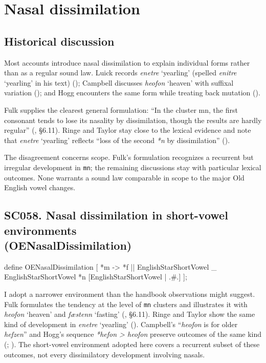 \documentclass[
  british,
  a4paper,
  openany]{book}
\providecommand{\texorpdfstring}[2]{#1}
\DeclareRobustCommand{\CAPRRuleHeading}[2]{%
  #1\texorpdfstring{\\(#2)}{ (#2)}%
}
\begin{document}
\newpage

\section{Nasal dissimilation}\label{nasal-dissimilation}

\subsection{Historical discussion}\label{historical-discussion-30}

Most accounts introduce nasal dissimilation to explain individual forms
rather than as a regular sound law. Luick records \emph{enetre}
`yearling' (spelled \emph{enitre} `yearling' in his text)
(); Campbell discusses
\emph{heofon} `heaven' with suffixal variation
(); and Hogg encounters
the same form while treating back mutation ().

Fulk supplies the clearest general formulation: ``In the cluster mn, the
first consonant tends to lose its nasality by dissimilation, though the
results are hardly regular'' (,
§6.11). Ringe and Taylor stay close to the lexical evidence and note
that \emph{enetre} `yearling' reflects ``loss of the second \emph{*n} by
dissimilation'' ().

The disagreement concerns scope. Fulk's formulation recognizes a
recurrent but irregular development in \texttt{mn}; the remaining
discussions stay with particular lexical outcomes. None warrants a sound
law comparable in scope to the major Old English vowel changes.

\subsection{\texorpdfstring{\CAPRRuleHeading{SC058. Nasal dissimilation in short-vowel environments}{OENasalDissimilation}}{}}\label{rule-OENasalDissimilation}

\begin{ReaderFacingFoma}
define OENasalDissimilation [
    {*m} -> {*f} || EnglishStarShortVowel _ EnglishStarShortVowel {*n} [EnglishStarShortVowel | .#.]
];
\end{ReaderFacingFoma}

I adopt a narrower environment than the handbook observations might
suggest. Fulk formulates the tendency at the level of \texttt{mn}
clusters and illustrates it with \emph{heofon} `heaven' and
\emph{fæstenn} `fasting' (,
§6.11). Ringe and Taylor show the same kind of development in
\emph{enetre} `yearling' (). Campbell's ``\emph{heofon} is for older
\emph{hefzen}'' and Hogg's sequence \emph{*hefon > heofon} preserve
outcomes of the same kind (; ). The short-vowel
environment adopted here covers a recurrent subset of these outcomes,
not every dissimilatory development involving nasals.
\end{document}
